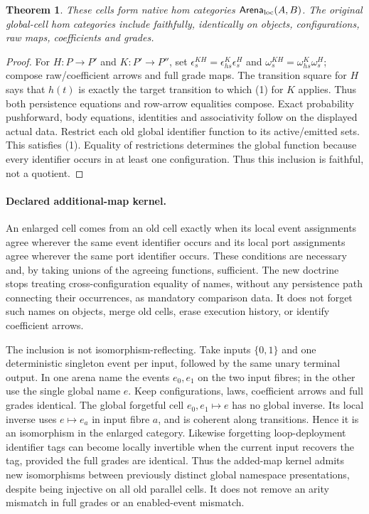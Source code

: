 \documentclass[11pt]{article}
\newtheorem{theorem}[definition]{Theorem}
\begin{document}
\begin{theorem}
These cells form native hom categories $\mathsf{Arena}_{\rm loc}(A,B)$.
The original global-cell hom categories include faithfully, identically on
objects, configurations, raw maps, coefficients and grades.
\end{theorem}
\begin{proof}
For $H:P\to P'$ and $K:P'\to P''$, set
$\epsilon^{KH}_s=\epsilon^K_{h s}\epsilon^H_s$ and
$\omega^{KH}_s=\omega^K_{h s}\omega^H_s$; compose raw/coefficient arrows and
full grade maps. The transition square for $H$ says that $h(t)$ is exactly
the target transition to which (1) for $K$ applies. Thus both persistence
equations and row-arrow equalities compose. Exact probability pushforward,
body equations, identities and associativity follow on the displayed actual
data. Restrict each old global identifier function to its active/emitted
sets. This satisfies (1). Equality of restrictions determines the global
function because every identifier occurs in at least one configuration.
Thus this inclusion is faithful, not a quotient.
\end{proof}

\paragraph{Declared additional-map kernel.}
An enlarged cell comes from an old cell exactly when its local event assignments
agree wherever the same event identifier occurs and its local port assignments
agree wherever the same port identifier occurs. These conditions are
necessary and, by taking unions of the agreeing functions, sufficient.
The new doctrine stops treating cross-configuration equality of names,
without any persistence path connecting their occurrences, as mandatory
comparison data. It does not forget such names on objects, merge old cells,
erase execution history, or identify coefficient arrows.

The inclusion is not isomorphism-reflecting. Take inputs $\{0,1\}$ and one
deterministic singleton event per input, followed by the same unary terminal
output. In one arena name the events $e_0,e_1$ on the two input fibres; in
the other use the single global name $e$. Keep configurations, laws,
coefficient arrows and full grades identical. The global forgetful cell
$e_0,e_1\mapsto e$ has no global inverse. Its local inverse uses $e\mapsto
e_a$ in input fibre $a$, and is coherent along transitions. Hence it is an
isomorphism in the enlarged category. Likewise forgetting loop-deployment
identifier tags can become locally invertible when the current input
recovers the tag, provided the full grades are identical. Thus the added-map
kernel admits new isomorphisms between previously distinct global namespace
presentations, despite being injective on all old parallel cells. It does
not remove an arity mismatch in full grades or an enabled-event mismatch.
\end{document}

